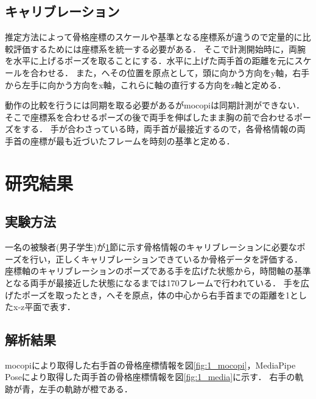 \documentclass[a4j, fleqn, 12pt]{jsreport}
\begin{document}
\section{キャリブレーション}\label{kyari}
推定方法によって骨格座標のスケールや基準となる座標系が違うので定量的に比較評価するためには座標系を統一する必要がある．
そこで計測開始時に，両腕を水平に上げるポーズを取ることにする．水平に上げた両手首の距離を元にスケールを合わせる．
また，へその位置を原点として，頭に向かう方向をy軸，右手から左手に向かう方向をx軸，これらに軸の直行する方向をz軸と定める．

動作の比較を行うには同期を取る必要があるがmocopiは同期計測ができない．
そこで座標系を合わせるポーズの後で両手を伸ばしたまま胸の前で合わせるポーズをする．
手が合わさっている時，両手首が最接近するので，各骨格情報の両手首の座標が最も近づいたフレームを時刻の基準と定める．

\chapter{研究結果}
\section{実験方法}
一名の被験者(男子学生)が\ref{kyari}節に示す骨格情報のキャリブレーションに必要なポーズを行い，正しくキャリブレーションできているか骨格データを評価する．
座標軸のキャリブレーションのポーズである手を広げた状態から，時間軸の基準となる両手が最接近した状態になるまでは170フレームで行われている．
手を広げたポーズを取ったとき，へそを原点，体の中心から右手首までの距離を1としたx-z平面で表す．
\section{解析結果}
mocopiにより取得した右手首の骨格座標情報を図\ref{fig:1_mocopi}，MediaPipe Poseにより取得した両手首の骨格座標情報を図\ref{fig:1_media}に示す．
右手の軌跡が青，左手の軌跡が橙である．
\end{document}
